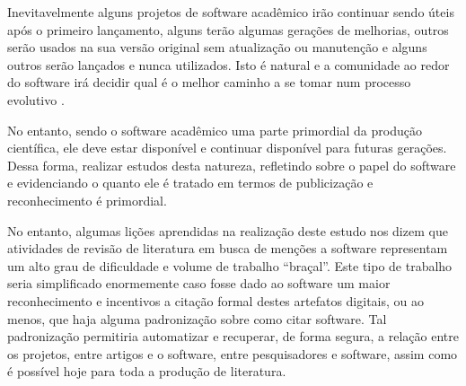 %

Inevitavelmente alguns projetos de software acadêmico irão continuar sendo
úteis após o primeiro lançamento, alguns terão algumas gerações de melhorias,
outros serão usados na sua versão original sem atualização ou manutenção e
alguns outros serão lançados e nunca utilizados. Isto é natural e 
a comunidade ao redor do software irá decidir qual é o melhor caminho a se
tomar num processo evolutivo \cite{weiner2009astronomical}.

No entanto, sendo o software acadêmico uma parte primordial da produção
científica, ele deve estar disponível e continuar disponível para futuras
gerações. Dessa forma, realizar estudos desta natureza, refletindo sobre
o papel do software e evidenciando o quanto ele é tratado em termos
de publicização e reconhecimento é primordial.

No entanto, algumas lições aprendidas na realização deste estudo nos dizem que
atividades de revisão de literatura em busca de menções a software representam
um alto grau de dificuldade e volume de trabalho ``braçal''. Este tipo de trabalho seria
simplificado enormemente caso fosse dado ao software um maior reconhecimento e
incentivos a citação formal destes artefatos digitais, ou ao menos, que haja
alguma padronização sobre como citar software. Tal padronização permitiria automatizar e
recuperar, de forma segura, a relação entre os projetos, entre artigos e o
software, entre pesquisadores e software, assim como é possível hoje para toda
a produção de literatura.



